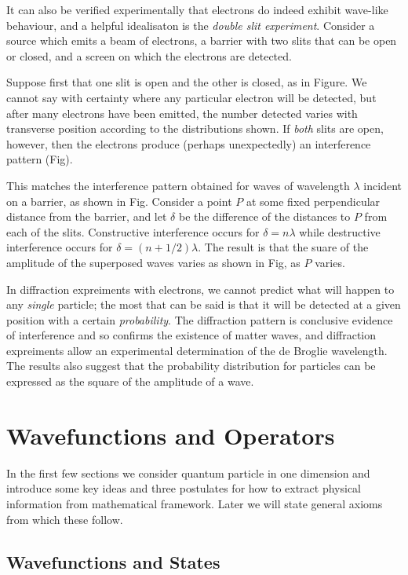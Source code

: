 \documentclass[a4paper]{article}
\begin{document}
It can also be verified experimentally that electrons do indeed exhibit wave-like behaviour, and a helpful idealisaton is the \emph{double slit experiment}. Consider a source which emits a beam of electrons, a barrier with two slits that can be open or closed, and a screen on which the electrons are detected.

Suppose first that one slit is open and the other is closed, as in Figure. We cannot say with certainty where any particular electron will be detected, but after many electrons have been emitted, the number detected varies with transverse position according to the distributions shown. If \emph{both} slits are open, however, then the electrons produce (perhaps unexpectedly) an interference pattern (Fig).

This matches the interference pattern obtained for waves of wavelength $\lambda$ incident on a barrier, as shown in Fig. Consider a point $P$ at some fixed perpendicular distance from the barrier, and let $\delta$ be the difference of the distances to $P$ from each of the slits. Constructive interference occurs for $\delta=n\lambda$ while destructive interference occurs for $\delta=(n+1/2)\lambda$. The result is that the suare of the amplitude of the superposed waves varies as shown in Fig, as $P$ varies.

In diffraction expreiments with electrons, we cannot predict what will happen to any \emph{single} particle; the most that can be said is that it will be detected at a given position with a certain \emph{probability}. The diffraction pattern is conclusive evidence of interference and so confirms the existence of matter waves, and diffraction expreiments allow an experimental determination of the de Broglie wavelength. The results also suggest that the probability distribution for particles can be expressed as the square of the amplitude of a wave.

\section{Wavefunctions and Operators}

In the first few sections we consider quantum particle in one dimension and introduce some key ideas and three postulates for how to extract physical information from mathematical framework. Later we will state general axioms from which these follow.

\subsection{Wavefunctions and States}
\end{document}
